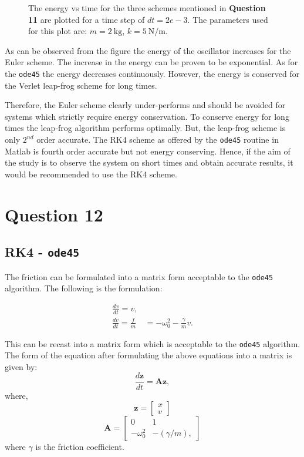 \documentclass[10pt]{article}
\begin{document}
\begin{figure}[!htb]
\centering

\caption{The energy vs time for the three schemes mentioned in \textbf{Question 11} are plotted for a time step of $dt=2e-3$. The parameters used for this plot are: $m=2\ \mathrm{kg}$, $k=5\ \mathrm{N/m}$.}
\label{fig:energy_vs_time_integration_schemes_compare}
\end{figure} 

As can be observed from the figure the energy of the oscillator increases for the Euler scheme. The increase in the energy can be proven to be exponential. As for the \texttt{ode45} the energy decreases continuously. However, the energy is conserved for the Verlet leap-frog scheme for long times. 

Therefore, the Euler scheme clearly under-performs and should be avoided for systems which strictly require energy conservation. To conserve energy for long times the leap-frog algorithm performs optimally. But, the leap-frog scheme is only $2^{nd}$ order accurate. The RK4 scheme as offered by the \texttt{ode45} routine in Matlab is fourth order accurate but not energy conserving. Hence, if the aim of the study is to observe the system on short times and obtain accurate results, it would be recommended to use the RK4 scheme.   

\section*{Question 12}
\subsection*{RK4 - \texttt{ode45}}
The friction can be formulated into a matrix form acceptable to the \texttt{ode45} algorithm. The following is the formulation:

\begin{eqnarray}
\frac{dx}{dt}=v, \\
\frac{dv}{dt}=\frac{f}{m} &= -\omega_{0}^2 -\frac{\gamma}{m} v.
\end{eqnarray}

This can be recast into a matrix form which is acceptable to the \texttt{ode45} algorithm. The form of the equation after formulating the above equations into a matrix is given by:
%
\begin{equation}
\frac{d\bm{z}}{dt} = \bm{A}\bm{z},
\end{equation}
%
where,
%
\begin{equation}
\bm{z} = 
\begin{bmatrix}
x \\
v 
\end{bmatrix}
\end{equation}
%
\begin{equation}
\bm{A} = 
\begin{bmatrix}
0 & 1 \\
-\omega_{0}^2 & -(\gamma/m),
\end{bmatrix}
\end{equation}
%
where $\gamma$ is the friction coefficient. 
\end{document}
